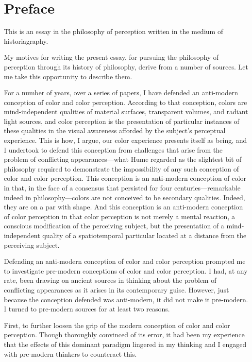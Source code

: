 \chapter*{Preface} %
\label{cha:preface}


This is an essay in the philosophy of perception written in the medium of historiagraphy. 

My motives for writing the present essay, for pursuing the philosophy of perception through its history of philosophy, derive from a number of sources. Let me take this opportunity to describe them.

For a number of years, over a series of papers, I have defended an anti-modern conception of color and color perception. According to that conception, colors are mind-independent qualities of material surfaces, transparent volumes, and radiant light sources, and color perception is the presentation of particular instances of these qualities in the visual awareness afforded by the subject's perceptual experience. This is how, I argue, our color experience presents itself as being, and I undertook to defend this conception from challenges that arise from the problem of conflicting appearances---what Hume regarded as the slightest bit of philosophy required to demonstrate the impossibility of any such conception of color and color perception. This conception is an anti-modern conception of color in that, in the face of a consensus that persisted for four centuries---remarkable indeed in philosophy---colors are not conceived to be secondary qualities. Indeed, they are on a par with shape. And this conception is an anti-modern conception of color perception in that color perception is not merely a mental reaction, a conscious modification of the perceiving subject, but the presentation of a mind-independent quality of a spatiotemporal particular located at a distance from the perceiving subject. 

Defending an anti-modern conception of color and color perception prompted me to investigate pre-modern conceptions of color and color perception. I had, at any rate, been drawing on ancient sources in thinking about the problem of conflicting appearances as it arises in its contemporary guise. However, just because the conception defended was anti-modern, it did not make it pre-modern. I turned to pre-modern sources for at least two reasons. 

First, to further loosen the grip of the modern conception of color and color perception. Though thoroughly convinced of its error, it had been my experience that the effects of this dominant paradigm lingered in my thinking and I engaged with pre-modern thinkers to counteract this. 

